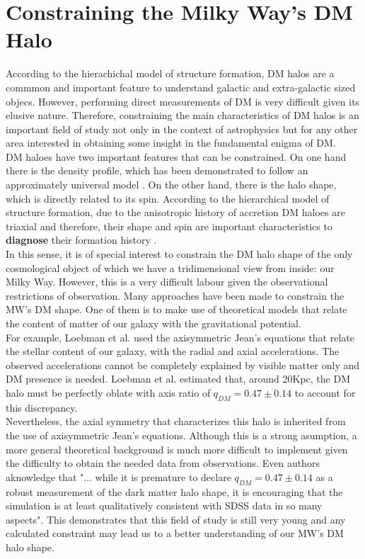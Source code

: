 \section{Constraining the Milky Way's DM Halo}
According to the hierachichal model of structure formation, DM halos are a commmon and important feature to understand galactic and extra-galactic sized objecs. 
However, performing direct measurements of DM is very difficult given its elusive nature. 
Therefore, constraining the main characteristics of DM halos is an important field of study not only in the context of astrophysics but for any other area interested in obtaining some insight in the fundamental enigma of DM.\\

DM haloes have two important features that can be constrained. 
On one hand there is the density profile, which has been demonstrated to follow an approximately universal model \cite{Navarro et al. 2010}. 
On the other hand, there is the halo shape, which is directly related to its spin. 
According to the hierarchical model of structure formation, due to the anisotropic history of accretion DM haloes are triaxial and therefore, their shape and spin are important characteristics to \textbf{diagnose} their formation history \cite{Bardeen et al. 1986}.\\

In this sense, it is of special interest to constrain the DM halo shape of the only cosmological object of which we have a tridimensional view from inside: our Milky Way. However, this is a very difficult labour given the observational restrictions of observation. Many approaches have been made to constrain the MW's DM shape. One of them is to make use of theoretical models that relate the content of matter of our galaxy with the gravitational potential.\\

For example, Loebman et al. \cite{Loebman et al 2012} used the axisymmetric Jean's equations \cite{Jean 2015} that relate the stellar content of our galaxy, with the radial and axial accelerations. 
The observed accelerations cannot be completely explained by visible matter only and DM presence is needed. Loebman et al. estimated that, around 20Kpc, the DM halo must be perfectly oblate with axis ratio of $q_{DM}=0.47 \pm 0.14$ to account for this discrepancy.\\

Nevertheless, the axial symmetry that characterizes this halo is inherited from the use of axisymmetric Jean's equations. 
Although this is a strong asumption, a more general theoretical background is much more difficult to implement given the difficulty to obtain the needed data from observations. 
Even authors aknowledge that "... while it is premature to declare $q_{DM}=0.47 \pm 0.14$ as a robust measurement of the dark matter halo shape, it is encouraging that the simulation is at least qualitatively consistent with SDSS data in so many aspects".
This demonstrates that this field of study is still very young and any calculated constraint may lead us to a better understanding of our MW's DM halo shape.\\

